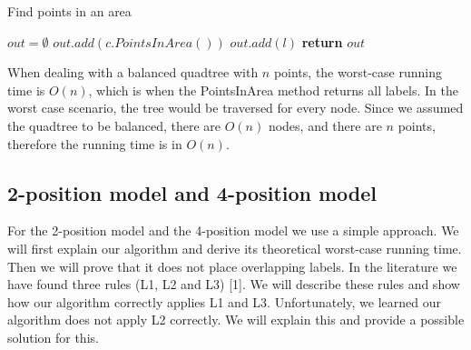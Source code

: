 \documentclass[crop=false,a4paper,oneside,11pt]{article}
\begin{document}
\begin{algorithm}[H]
\caption{Find points in an area}
\begin{algorithmic}[1]
\State $out = \emptyset$
\State $out.add(c.PointsInArea())$
\EndIf
\EndFor
\Else{}
\State $out.add(l)$
\EndIf
\EndFor
\EndIf
\State \textbf{return} $out$
\EndProcedure
\end{algorithmic}
\end{algorithm}

When dealing with a balanced quadtree with $n$ points, the worst-case running time is $O(n)$, which is when the PointsInArea method returns all labels. In the worst case scenario, the tree would be traversed for every node. Since we assumed the quadtree to be balanced, there are $O(n)$ nodes, and there are $n$ points, therefore the running time is in $O(n)$.

\subsection{2-position model and 4-position model}
For the 2-position model and the 4-position model we use a simple approach. We will first explain our algorithm and derive its theoretical worst-case running time. Then we will prove that it does not place overlapping labels. In the literature we have found three rules (L1, L2 and L3) [1]. We will describe these rules and show how our algorithm correctly applies L1 and L3. Unfortunately, we learned our algorithm does not apply L2 correctly. We will explain this and provide a possible solution for this.
\end{document}
